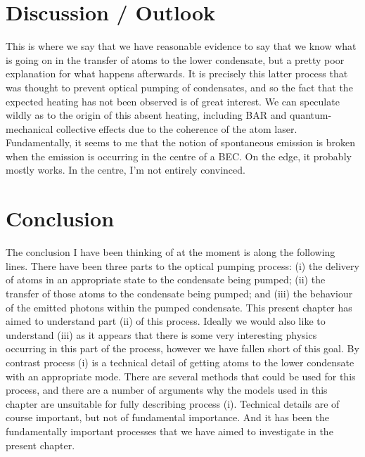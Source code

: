 \section{Discussion / Outlook}

This is where we say that we have reasonable evidence to say that we know what is going on in the transfer of atoms to the lower condensate, but a pretty poor explanation for what happens afterwards.  It is precisely this latter process that was thought to prevent optical pumping of condensates, and so the fact that the expected heating has not been observed is of great interest.  We can speculate wildly as to the origin of this absent heating, including BAR and quantum-mechanical collective effects due to the coherence of the atom laser.  Fundamentally, it seems to me that the notion of spontaneous emission is broken when the emission is occurring in the centre of a BEC.  On the edge, it probably mostly works.  In the centre, I'm not entirely convinced.

\section{Conclusion}

The conclusion I have been thinking of at the moment is along the following lines.  There have been three parts to the optical pumping process: (i) the delivery of atoms in an appropriate state to the condensate being pumped; (ii) the transfer of those atoms to the condensate being pumped; and (iii) the behaviour of the emitted photons within the pumped condensate.  This present chapter has aimed to understand part (ii) of this process.  Ideally we would also like to understand (iii) as it appears that there is some very interesting physics occurring in this part of the process, however we have fallen short of this goal.  By contrast process (i) is a technical detail of getting atoms to the lower condensate with an appropriate mode.  There are several methods that could be used for this process, and there are a number of arguments why the models used in this chapter are unsuitable for fully describing process (i).  Technical details are of course important, but not of fundamental importance.  And it has been the fundamentally important processes that we have aimed to investigate in the present chapter.
